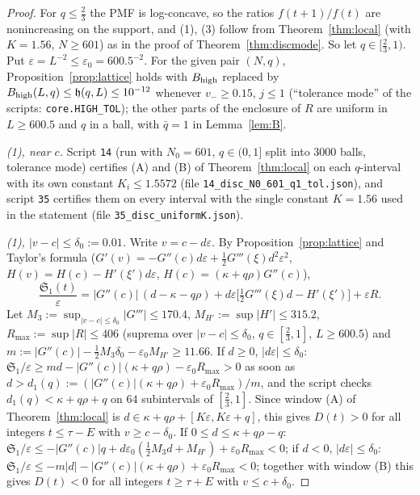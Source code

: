 \documentclass[11pt,a4paper]{article}
\theoremstyle{definition}
\theoremstyle{remark}
\begin{document}
\begin{proof}
For $q\le\frac23$ the PMF is log-concave, so the ratios $f(t+1)/f(t)$ are nonincreasing on the support, and (1), (3)
follow from Theorem~\ref{thm:local} (with $K=1.56$, $N\ge601$) as in the proof of Theorem~\ref{thm:discmode}. So let
$q\in[\frac23,1)$. Put
$\varepsilon=L^{-2}\le\varepsilon_0=600.5^{-2}$. For the given pair $(N,q)$, Proposition~\ref{prop:lattice} holds
with $B_{\rm high}$ replaced by $B_{\rm high}(L,q)\le\mathfrak h(q,L)\le10^{-12}$ whenever $v_-\ge0.15$, $j\le1$
(``tolerance mode'' of the scripts: \texttt{core.HIGH\_TOL}); the other parts of the enclosure of $R$ are uniform in
$L\ge600.5$ and $q$ in a ball, with $\bar q=1$ in Lemma~\ref{lem:B}.

\emph{(1), near $c$.} Script \texttt{14} (run with $N_0=601$, $q\in(0,1]$ split into $3000$ balls, tolerance mode)
certifies (A) and (B) of Theorem~\ref{thm:local} on each $q$-interval with its own constant $K_i\le1.5572$ (file
\texttt{14\_disc\_N0\_601\_q1\_tol.json}), and script \texttt{35} certifies them on every interval with the single
constant $K=1.56$ used in the statement (file \texttt{35\_disc\_uniformK.json}). %

\emph{(1), $|v-c|\le\delta_0:=0.01$.} Write $v=c-d\varepsilon$. By Proposition~\ref{prop:lattice} and Taylor's formula
($G'(v)=-G''(c)d\varepsilon+\frac12G'''(\xi)d^2\varepsilon^2$, $H(v)=H(c)-H'(\xi')d\varepsilon$,
$H(c)=(\kappa+q\rho)G''(c)$),
\[
  \frac{\mathfrak S_1(t)}{\varepsilon}=|G''(c)|\,(d-\kappa-q\rho)+d\varepsilon\bigl[\tfrac12G'''(\xi)d-H'(\xi')\bigr]+\varepsilon R .
\]
Let $M_3:=\sup_{|v-c|\le\delta_0}|G'''|\le170.4$, $M_{H'}:=\sup|H'|\le315.2$, $R_{\max}:=\sup|R|\le406$ (suprema over
$|v-c|\le\delta_0$, $q\in[\frac23,1]$, $L\ge600.5$) and $m:=|G''(c)|-\frac12M_3\delta_0-\varepsilon_0M_{H'}\ge11.66$.
If $d\ge0$, $|d\varepsilon|\le\delta_0$: $\mathfrak S_1/\varepsilon\ge md-|G''(c)|(\kappa+q\rho)-\varepsilon_0R_{\max}>0$ as soon as
$d>d_1(q):=(|G''(c)|(\kappa+q\rho)+\varepsilon_0R_{\max})/m$, and the script checks $d_1(q)<\kappa+q\rho+q$ on $64$
subintervals of $[\frac23,1]$. Since window (A) of Theorem~\ref{thm:local} is $d\in\kappa+q\rho+[K\varepsilon,K\varepsilon+q]$,
this gives $D(t)>0$ for all integers $t\le\tau-E$ with $v\ge c-\delta_0$. If $0\le d\le\kappa+q\rho-q$:
$\mathfrak S_1/\varepsilon\le-|G''(c)|q+d\varepsilon_0(\frac12M_3d+M_{H'})+\varepsilon_0R_{\max}<0$; if $d<0$, $|d\varepsilon|\le\delta_0$:
$\mathfrak S_1/\varepsilon\le-m|d|-|G''(c)|(\kappa+q\rho)+\varepsilon_0R_{\max}<0$; together with window (B) this gives
$D(t)<0$ for all integers $t\ge\tau+E$ with $v\le c+\delta_0$.


\end{proof}
\end{document}
